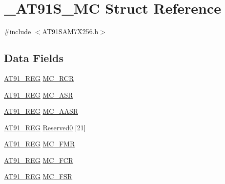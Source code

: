 \hypertarget{struct__AT91S__MC}{\section{\-\_\-\-A\-T91\-S\-\_\-\-M\-C Struct Reference}
\label{struct__AT91S__MC}
}


{\ttfamily \#include $<$A\-T91\-S\-A\-M7\-X256.\-h$>$}

\subsection*{Data Fields}
\begin{DoxyCompactItemize}
\item 
\hyperlink{GCC_2ARM7__AT91SAM7S_2AT91SAM7X256_8h_a712ad5a1ac1bd02f3e95a7526c283ce1}{A\-T91\-\_\-\-R\-E\-G} \hyperlink{struct__AT91S__MC_a57612900eca5edeaf8ac6abf329b377b}{M\-C\-\_\-\-R\-C\-R}
\item 
\hyperlink{GCC_2ARM7__AT91SAM7S_2AT91SAM7X256_8h_a712ad5a1ac1bd02f3e95a7526c283ce1}{A\-T91\-\_\-\-R\-E\-G} \hyperlink{struct__AT91S__MC_ab47579897e838e5bbfb891e81da1652c}{M\-C\-\_\-\-A\-S\-R}
\item 
\hyperlink{GCC_2ARM7__AT91SAM7S_2AT91SAM7X256_8h_a712ad5a1ac1bd02f3e95a7526c283ce1}{A\-T91\-\_\-\-R\-E\-G} \hyperlink{struct__AT91S__MC_af933b6454cfd253ef5432fdd3101d70f}{M\-C\-\_\-\-A\-A\-S\-R}
\item 
\hyperlink{GCC_2ARM7__AT91SAM7S_2AT91SAM7X256_8h_a712ad5a1ac1bd02f3e95a7526c283ce1}{A\-T91\-\_\-\-R\-E\-G} \hyperlink{struct__AT91S__MC_a582ab62c12a101ecabef840aea6af54b}{Reserved0} \mbox{[}21\mbox{]}
\item 
\hyperlink{GCC_2ARM7__AT91SAM7S_2AT91SAM7X256_8h_a712ad5a1ac1bd02f3e95a7526c283ce1}{A\-T91\-\_\-\-R\-E\-G} \hyperlink{struct__AT91S__MC_a9552be45c7dbc7f54aa406c6b77ee7e5}{M\-C\-\_\-\-F\-M\-R}
\item 
\hyperlink{GCC_2ARM7__AT91SAM7S_2AT91SAM7X256_8h_a712ad5a1ac1bd02f3e95a7526c283ce1}{A\-T91\-\_\-\-R\-E\-G} \hyperlink{struct__AT91S__MC_ae7a860b146a2962b83c31ed2750da583}{M\-C\-\_\-\-F\-C\-R}
\item 
\hyperlink{GCC_2ARM7__AT91SAM7S_2AT91SAM7X256_8h_a712ad5a1ac1bd02f3e95a7526c283ce1}{A\-T91\-\_\-\-R\-E\-G} \hyperlink{struct__AT91S__MC_ab2884bb7b1cbca9125cde189992a6ea7}{M\-C\-\_\-\-F\-S\-R}
\end{DoxyCompactItemize}


